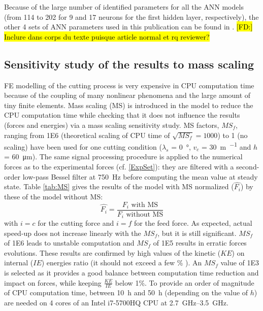 \documentclass[preprint,12pt,times]{elsarticle}
\DeclareRobustCommand{\FD}[1]{ {\begingroup\sethlcolor{VWgreen}\textcolor{black}{\hl{[FD:] #1}}\endgroup} }
\begin{document}
Because of the large number of identified parameters for all the ANN models (from 114 to 202 for 9 and 17 neurons for the first hidden layer, respectively), the other 4 sets of ANN parameters used in this publication can be found in \cite{pantale_Coefficients_2022}.\FD{Inclure dans corps du texte puisque article normal et rq reviewer?}

\subsection{Sensitivity study of the results to mass scaling}

FE modelling of the cutting process is very expensive in CPU computation time because of the coupling of many nonlinear phenomena and the large amount of tiny finite elements. Mass scaling (MS) is introduced in the model to reduce the CPU computation time while checking that it does not influence the results (forces and energies) via a mass scaling sensitivity study. MS factors, ${MS}_f$, ranging from \num{1E6} (theoretical scaling of CPU time of $\sqrt{{MS}_f} = \num{1000}$) to 1 (no scaling) have been used for one cutting condition ($\lambda_s$ = \qty{0}{\degree}, $v_c$ = \qty{30}{\m\per\min} and $h$ = \qty{60}{\um}). The same signal processing procedure is applied to the numerical forces as to the experimental forces (cf. \ref{ExpSet}): they are filtered with a second-order low-pass Bessel filter at \qty{750}{\Hz} before computing the mean value at steady state. Table \ref{tab:MS} gives the results of the model with MS normalized ($\hat{F_i}$) by these of the model without MS:
%
\begin{equation}
\hat{F_i} = \frac{F_i\text{ with MS}}{F_i\text{ without MS}}
\end{equation}
%
with $i = c$ for the cutting force and $i = f$ for the feed force. As expected, actual speed-up does not increase linearly with the ${MS}_f$, but it is still significant. ${MS}_f$ of \num{1E6} leads to unstable computation and ${MS}_f$ of 1E5 results in erratic forces evolutions. These results are confirmed by high values of the kinetic ($KE$) on internal ($IE$) energies ratio (it should not exceed a few \% \cite{wang_Investigation_2011, ducobu_Introduction_2015}). An ${MS}_f$ value of 1E3 is selected as it provides a good balance between computation time reduction and impact on forces, while keeping $\frac{KE}{IE}$ below 1\%. To provide an order of magnitude of CPU computation time, between \qty{10}{\hour} and \qty{50}{\hour} (depending on the value of $h$) are needed on 4 cores of an Intel i7-5700HQ CPU at \qtyrange{2.7}{3.5}{\GHz}.
\end{document}
